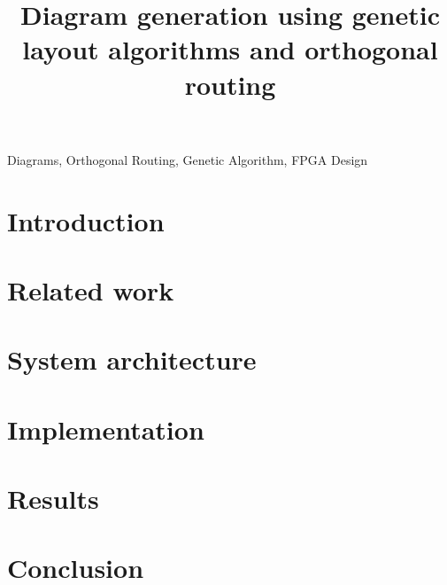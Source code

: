 \documentclass[conference]{IEEEtran}
\begin{document}
\title{Diagram generation using genetic layout algorithms and orthogonal routing}



\author{
  }

\maketitle

\begin{abstract} 

\end{abstract}

\begin{IEEEkeywords}
Diagrams, Orthogonal Routing, Genetic Algorithm, FPGA Design 
\end{IEEEkeywords}

\section{Introduction}
\label{sec:introduction}


\section{Related work}
\label{sec:relatedwork}


\section{System architecture}
\label{sec:architecture}


\section{Implementation}
\label{sec:implementation}



\section{Results} 
\label{sec:results}


\section{Conclusion}
\label{sec:conclusion}




\end{document}
